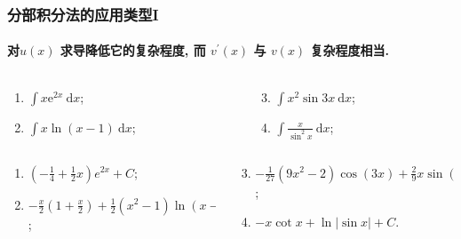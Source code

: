 \documentclass[
10pt,
aspectratio=43,
]{beamer}
\begin{document}
\begin{frame}
	\frametitle{分部积分法的应用类型I}
	\framesubtitle{对$u(x)$ 求导降低它的复杂程度, 而 $v^{\prime}(x)$ 与 $v(x)$ 复杂程度相当. }
	\everymath{\displaystyle}
	\begin{block}{}
		\begin{columns}[onlytextwidth]
			\begin{column}{0.5\textwidth}
				\begin{enumerate}
					\item $\int x \mathrm{e}^{2 x} \mathrm{~d} x$;
					\item $\int x \ln (x-1) \mathrm{~d} x$;
				\end{enumerate}
			\end{column}
			\begin{column}{0.5\textwidth}
				\begin{enumerate}
					\setcounter{enumi}{2}
					\item $\int x^2 \sin 3 x \mathrm{~d} x$;
					\item $\int \frac{x}{\sin ^2 x} \mathrm{~d} x$;
				\end{enumerate}
			\end{column}
		\end{columns}
	\end{block}
	\pause
	\begin{exampleblock}{}
		\begin{columns}[onlytextwidth]
			\begin{column}{0.5\textwidth}
				\begin{enumerate}
					\pause \item $\left(-\frac{1}{4}+\frac{1}{2}x\right)e^{2x}+C$;
					\pause \item $-\frac{x}{2}\left(1+\frac{x}{2}\right)+\frac{1}{2}\left(x^2-1\right)\ln(x-1)+C$;
				\end{enumerate}
			\end{column}
			\begin{column}{0.5\textwidth}
				\begin{enumerate}
					\setcounter{enumi}{2}
					\pause \item $-\frac{1}{27} \left(9 x^2-2\right) \cos (3 x)+\frac{2}{9} x \sin (3 x)+C$;
					\pause \item $-x\cot x+\ln|\sin x|+C$.
				\end{enumerate}
			\end{column}
		\end{columns}
	\end{exampleblock}
\end{frame}
\end{document}
